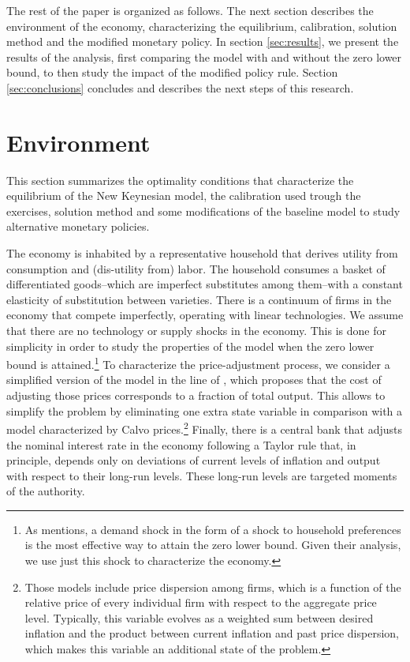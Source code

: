 \documentclass[11pt]{article}
\numberwithin{equation}{section}
\begin{document}
The rest of the paper is organized as follows. The next section describes the environment of the economy, characterizing the equilibrium, calibration, solution method and the modified monetary policy. In section \ref{sec:results}, we present the results of the analysis, first comparing the model with and without the zero lower bound, to then study the impact of the modified policy rule. Section \ref{sec:conclusions} concludes and describes the next steps of this research.

\section{Environment}\label{sec:model}

This section summarizes the optimality conditions that characterize the equilibrium of the New Keynesian model, the calibration used trough the exercises, solution method and some modifications of the baseline model to study alternative monetary policies. 

The economy is inhabited by a representative household that derives utility from consumption and (dis-utility from) labor. The household consumes a basket of differentiated goods--which are imperfect substitutes among them--with a constant elasticity of substitution between varieties. There is a continuum of firms in the economy that compete imperfectly, operating with linear technologies. We assume that there are no technology or supply shocks in the economy. This is done for simplicity in order to study the properties of the model when the zero lower bound is attained.\footnote{As \cite{Fernandez-VillaverdeEtAl2015} mentions, a demand shock in the form of a shock to household preferences is the most effective way to attain the zero lower bound. Given their analysis, we use just this shock to characterize the economy.} To characterize the price-adjustment process, we consider a simplified version of the model in the line of \cite{Rotemberg1982}, which proposes that the cost of adjusting those prices corresponds to a fraction of total output. This allows to simplify the problem by eliminating one extra state variable in comparison with a model characterized by Calvo prices.\footnote{Those models include price dispersion among firms, which is a function of the relative price of every individual firm with respect to the aggregate price level. Typically, this variable evolves as a weighted sum between desired inflation and the product between current inflation and past price dispersion, which makes this variable an additional state of the problem.} Finally, there is a central bank that adjusts the nominal interest rate in the economy following a Taylor rule that, in principle, depends only on deviations of current levels of inflation and output with respect to their long-run levels. These long-run levels are targeted moments of the authority. 
\end{document}
